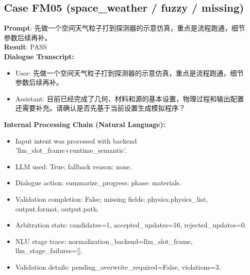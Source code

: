 \documentclass[11pt]{ctexart}
\begin{document}
\subsection{Case FM05 (space\_weather / fuzzy / missing)}
\textbf{Prompt}: 先做一个空间天气粒子打到探测器的示意仿真，重点是流程跑通，细节参数后续再补。\\
\textbf{Result}: PASS\\
\textbf{Dialogue Transcript:}
\begin{itemize}
\item User: 先做一个空间天气粒子打到探测器的示意仿真，重点是流程跑通，细节参数后续再补。
\item Assistant: 目前已经完成了几何、材料和源的基本设置，物理过程和输出配置还需要补充。请确认是否先基于当前设置生成模拟程序？
\end{itemize}
\textbf{Internal Processing Chain (Natural Language):}
\begin{itemize}
\item Input intent was processed with backend 'llm\_slot\_frame+runtime\_semantic'.
\item LLM used: True; fallback reason: none.
\item Dialogue action: summarize\_progress; phase: materials.
\item Validation completion: False; missing fields: physics.physics\_list, output.format, output.path.
\item Arbitration stats: candidates=1, accepted\_updates=16, rejected\_updates=0.
\item NLU stage trace: normalization\_backend=llm\_slot\_frame, llm\_stage\_failures=[].
\item Validation details: pending\_overwrite\_required=False, violations=3.
\end{itemize}
\end{document}
